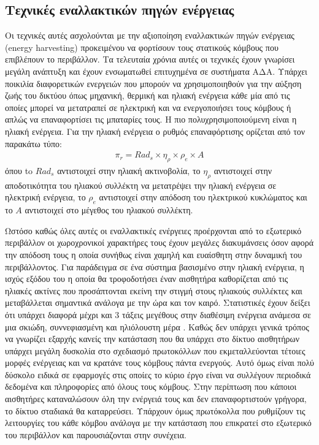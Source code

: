 \subsection{Τεχνικές εναλλακτικών πηγών ενέργειας}
Οι τεχνικές αυτές ασχολούνται με την αξιοποίηση εναλλακτικών πηγών ενέργειας (energy harvesting) προκειμένου να φορτίσουν τους στατικούς κόμβους που επιβλέπουν το
περιβάλλον. Τα τελευταία χρόνια αυτές οι τεχνικές έχουν γνωρίσει μεγάλη ανάπτυξη και έχουν ενσωματωθεί επιτυχημένα σε συστήματα ΑΔΑ. Υπάρχει ποικιλία διαφορετικών
ενεργειών που μπορούν να χρησιμοποιηθούν για την αύξηση ζωής του δικτύου όπως μηχανική, θερμική και ηλιακή ενέργεια κάθε μία από τις οποίες μπορεί να μετατραπεί σε
ηλεκτρική και να
ενεργοποιήσει τους κόμβους ή απλώς να επαναφορτίσει τις μπαταρίες τους. Η πιο πολυχρησιμοποιούμενη είναι η ηλιακή ενέργεια. Για την ηλιακή ενέργεια ο ρυθμός
επαναφόρτισης ορίζεται από τον παρακάτω τύπο:
\begin{align*}
\pi_{r} = Rad_{s} \times \eta_{\rho} \times \rho_{e} \times A
\end{align*}
όπου to $Rad_{s}$ αντιστοιχεί στην ηλιακή ακτινοβολία, το $\eta_{\rho}$ αντιστοιχεί στην αποδοτικότητα του ηλιακού συλλέκτη να μετατρέψει την ηλιακή ενέργεια σε
ηλεκτρική ενέργεια, το $\rho_{e}$ αντιστοιχεί στην απόδοση του ηλεκτρικού κυκλώματος και το $A$ αντιστοιχεί στο μέγεθος του ηλιακού συλλέκτη.

Ωστόσο καθώς όλες αυτές οι εναλλακτικές ενέργειες προέρχονται από το εξωτερικό περιβάλλον οι χωροχρονικοί χαρακτήρες τους έχουν μεγάλες διακυμάνσεις όσον αφορά την
απόδοση τους η οποία συνήθως είναι χαμηλή και ευαίσθητη στην δυναμική του περιβάλλοντος. Για παράδειγμα σε ένα σύστημα βασισμένο στην ηλιακή ενέργεια, η ισχύς εξόδου
του η οποία θα τροφοδοτήσει έναν αισθητήρα καθορίζεται από τις ηλιακές ακτίνες που προσάπτονται εκείνη την στιγμή στους ηλιακούς συλλέκτες και μεταβάλλεται σημαντικά
ανάλογα με την ώρα και τον καιρό. Στατιστικές έχουν δείξει ότι υπάρχει διαφορά μέχρι και 3 τάξεις μεγέθους στην διαθέσιμη ενέργεια ανάμεσα σε μια σκιώδη,
συννεφιασμένη και ηλιόλουστη μέρα \cite{harvesting_comparison}. Καθώς δεν υπάρχει γενικά τρόπος να γνωρίζει εξαρχής κανείς την κατάσταση που θα υπάρχει στο δίκτυο
αισθητήρων υπάρχει μεγάλη δυσκολία στο σχεδιασμό πρωτοκόλλων που εκμεταλλεύονται τέτοιες μορφές ενέργειας και να κρατάνε τους κόμβους πάντα ενεργούς. Αυτό όμως είναι
πολύ δύσκολο ειδικά σε εφαρμογές στις οποίες το κύριο έργο είναι να συλλέγουν περιοδικά δεδομένα και πληροφορίες από όλους τους κόμβους. Στην περίπτωση που κάποιοι
αισθητήρες καταναλώσουν όλη την ενέργειά τους και δεν επαναφορτιστούν γρήγορα, το δίκτυο σταδιακά θα καταρρεύσει. Υπάρχουν όμως πρωτόκολλα που ρυθμίζουν τις
λειτουργίες του κάθε κόμβου ανάλογα με την κατάσταση που επικρατεί στο εξωτερικό του περιβάλλον και παρουσιάζονται στην συνέχεια.

